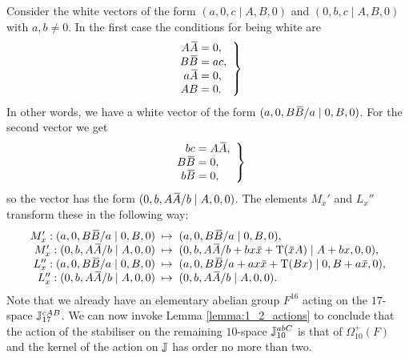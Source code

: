     Consider the white vectors of the form $(a,0,c\mid A,B,0)$ and $(0,b,c\mid A,B,0)$ with
    $a,b \neq 0$. In the first case the conditions for being white are
    \begin{equation*}
        \left.
            \begin{array}{r@{\;}c@{\;}l}
                A\ovA  & = & 0,\\
                B\ovB  & = & ac, \\
                a\ovA  & = & 0, \\
                AB & = & 0.
            \end{array}
        \right\}
    \end{equation*}
    In other words, we have a white vector of the form
    $(a,0,B\mathord{\mbox{\hspace*{0pt}}\,\overline{\!B\!\!\;}\!\:}\mbox{\hspace*{0pt}} /a\mid 0,B,0)$. For the second vector we get
    \begin{equation*}
        \left.
            \begin{array}{r@{\;}c@{\;}l}
                bc & = & A\ovA , \\
                B\ovB  & = & 0, \\
                b\ovB  & = & 0,
            \end{array}
        \right\}
    \end{equation*}
    so the vector has the form $(0,b,A\mathord{\mbox{\hspace*{0pt}}\,\overline{\!A\!\!\;}\!\:}\mbox{\hspace*{0pt}} /b\mid A,0,0)$. The elements $M_x'$ and $L_x''$
    transform these in the following way:
    \begin{equation*}
        \begin{array}{r@{\;\;}c@{\;\;}l}
            M_x': (a,0,B\ovB /a\mid 0,B,0) & \mapsto &
            (a,0,B\ovB /a\mid 0,B,0), \\
            M_x': (0,b,A\ovA /b\mid A,0,0) & \mapsto &
            (0,b,A\ovA /b+bx\ovx  + \Tr(\ovx A) \mid A+bx,0,0), \\
            L_x'': (a,0,B\ovB /a\mid 0,B,0) & \mapsto &
            (a,0,B\ovB /a+ax\ovx +\Tr(Bx)\mid 0,B+a\ovx , 0), \\
            L_x'': (0,b,A\ovA /b\mid A,0,0) & \mapsto &
            (0,b,A\ovA /b\mid A,0,0).
        \end{array}
    \end{equation*}
    Note that we already have an elementary abelian group $F^{16}$ acting
    on the $17$-space \mbox{$\mathbb{J}_{17}^{cAB}$}. We can now 
    invoke Lemma \ref{lemma:1_2_actions} to conclude that the action of the stabiliser
    on the remaining $10$-space $\mathbb{J}_{10}^{abC}$ is that of $\Omega_{10}^+(F)$ and the 
    kernel of the action on $\mathbb{J}$ has order no more than two. 

